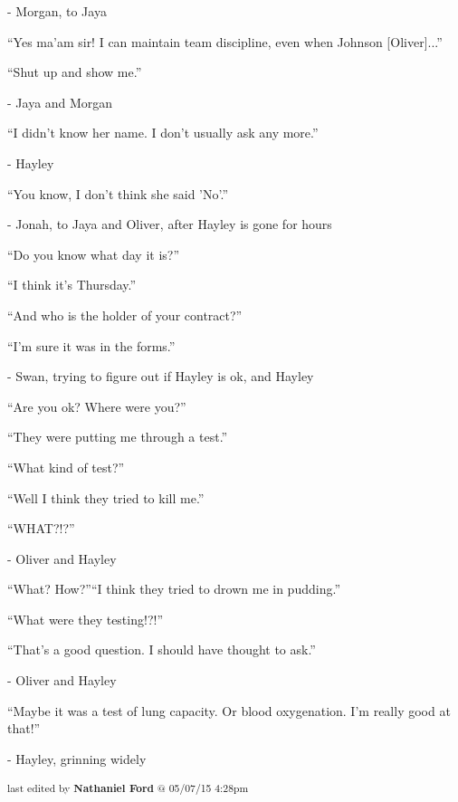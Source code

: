                 - Morgan, to Jaya



``Yes ma'am sir! I can maintain team discipline, even when Johnson {[}Oliver{]}...''

``Shut up and show me.''

                - Jaya and Morgan



``I didn't know her name.  I don't usually ask any more.''

- Hayley



``You know, I don't think she said 'No'.''

- Jonah, to Jaya and Oliver, after Hayley is gone for hours



``Do you know what day it is?''

``I think it's Thursday.''

``And who is the holder of your contract?''

``I'm sure it was in the forms.''

                - Swan, trying to figure out if Hayley is ok, and Hayley



``Are you ok?  Where were you?''

``They were putting me through a test.''

``What kind of test?''

``Well I think they tried to kill me.''

``WHAT?!?''

                - Oliver and Hayley



``What?  How?''``I think they tried to drown me in pudding.''

``What were they testing!?!''

``That's a good question.  I should have thought to ask.''

                - Oliver and Hayley



``Maybe it was a test of lung capacity.  Or blood oxygenation.  I'm really good at that!''

- Hayley, grinning widely


\vspace{\fill}

\begin{flushright}
\textsubscript{last edited by \textbf{Nathaniel Ford} @ 05/07/15 4:28pm}
\end{flushright}

